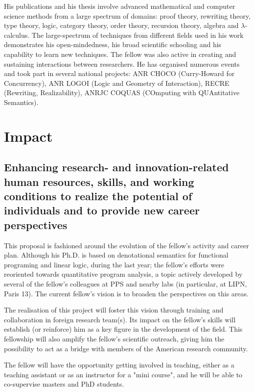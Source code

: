 \documentclass{article}[11pt]
\begin{document}
His publications and his thesis involve advanced mathematical and computer science methods from a large spectrum of domains: proof theory, rewriting theory, type theory, logic, category theory, order theory, recursion theory, algebra and $\lambda$-calculus. The large-spectrum of techniques from different fields used in his work demonstrates his open-mindedness, his broad scientific schooling and his capability to learn new techniques. The fellow was also active in creating and sustaining interactions between researchers. He has organised numerous events and took part in several national projects: ANR CHOCO (Curry-Howard for Concurrency), ANR LOGOI (Logic and Geometry of Interaction), RECRE (Rewriting, Realizability), ANRJC COQUAS (COmputing with QUAntitative Semantics).




\section{Impact}
\subsection{Enhancing research- and innovation-related human resources, skills, and working conditions to realize the potential of individuals and to provide new career perspectives}

This proposal is fashioned around the evolution of the fellow’s activity and career plan. Although his Ph.D. is based on denotational semantics for functional programing and linear logic, during the last year; the fellow’s efforts were reoriented towards quantitative program analysis, a topic actively developed by several of the fellow’s colleagues at PPS and nearby labs (in particular, at LIPN, Paris 13). The current fellow’s vision is to broaden the perspectives on this areas. 

The realisation of this project will foster this vision through training and collaboration in foreign research team(s). Its impact on the fellow’s skills will establish (or reinforce) him as a key figure in the development of the field. This fellowship will also amplify the fellow’s scientific outreach, giving him the possibility to act as a bridge with members of the American research community.

The fellow will have the opportunity getting involved in teaching, either as a teaching assistant or as an instructor for a "mini course", and he will be able to co-supervise masters and PhD students.
\end{document}
